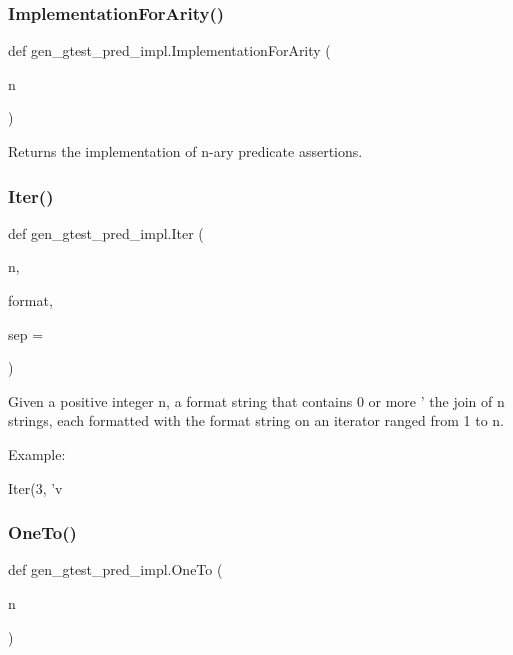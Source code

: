 \subsubsection{\texorpdfstring{ImplementationForArity()}{ImplementationForArity()}}
{\footnotesize\ttfamily def gen\+\_\+gtest\+\_\+pred\+\_\+impl.\+Implementation\+For\+Arity (\begin{DoxyParamCaption}\item[{}]{n }\end{DoxyParamCaption})}

\begin{DoxyVerb}Returns the implementation of n-ary predicate assertions.\end{DoxyVerb}
 \mbox{\label{namespacegen__gtest__pred__impl_ac016218b7c9437d1d5ac85c574c83069}} 
\subsubsection{\texorpdfstring{Iter()}{Iter()}}
{\footnotesize\ttfamily def gen\+\_\+gtest\+\_\+pred\+\_\+impl.\+Iter (\begin{DoxyParamCaption}\item[{}]{n,  }\item[{}]{format,  }\item[{}]{sep = {\ttfamily \textquotesingle{}\textquotesingle{}} }\end{DoxyParamCaption})}

\begin{DoxyVerb}Given a positive integer n, a format string that contains 0 or
more '%
the join of n strings, each formatted with the format string on an
iterator ranged from 1 to n.

Example:

Iter(3, 'v%
\end{DoxyVerb}
 \mbox{\label{namespacegen__gtest__pred__impl_a7920598d51c9dded76a4ef9ffde339e4}} 
\subsubsection{\texorpdfstring{OneTo()}{OneTo()}}
{\footnotesize\ttfamily def gen\+\_\+gtest\+\_\+pred\+\_\+impl.\+One\+To (\begin{DoxyParamCaption}\item[{}]{n }\end{DoxyParamCaption})}

